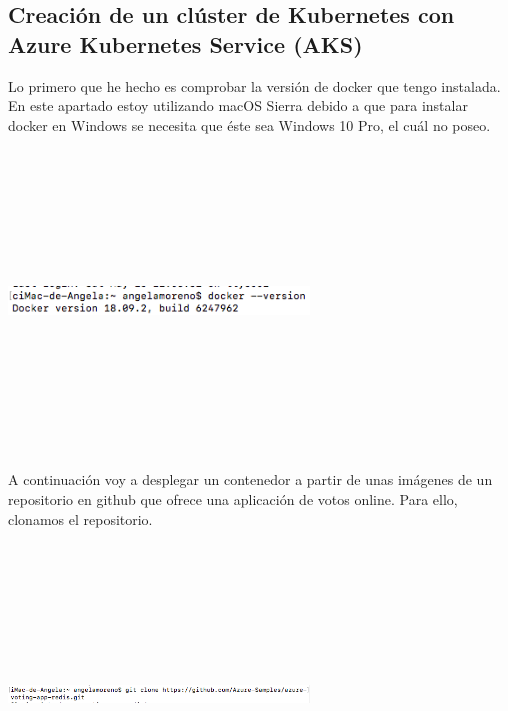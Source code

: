 \documentclass[english,runningheads,a4paper]{llncs}[2018/03/10]
\newenvironment{nscenter}
 {\parskip=0pt\par\nopagebreak\centering}
 {\par\noindent\ignorespacesafterend}
\begin{document}
\subsection*{Creación de un clúster de Kubernetes con Azure Kubernetes Service 
(AKS)}
Lo primero que he hecho es comprobar la versión de docker que tengo instalada.\\
En este apartado estoy utilizando macOS Sierra debido a que para instalar docker
en Windows se necesita que éste sea Windows 10 Pro, el cuál no poseo.
\newline
\begin{nscenter}
\includegraphics[width=8cm,height=8cm,keepaspectratio]{./Contenedores/Azure/10.png}
\end{nscenter}
\newline
A continuación voy a desplegar un contenedor a partir de unas imágenes de un 
repositorio en github que ofrece una aplicación de votos online. Para ello, 
clonamos el repositorio.
\newline
\begin{nscenter}
\includegraphics[width=8cm,height=8cm,keepaspectratio]{./Contenedores/Azure/11.png}
\end{nscenter}
\end{document}

